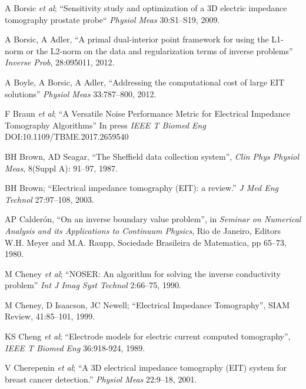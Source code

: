 \documentclass[10pt,journal]{IEEEtran}\def\TBLWIDA{15mm}\def\TBLWIDB{60mm}
\newcommand{\ifmaxthree}[2]{#2 {\em et al}; }
\begin{document}
\begin{thebibliography}{00}
\ifmaxthree{
A Borsic, R Halter R, Y Wan, A Hartov, KD Paulsen,
}{
A Borsic
}
``Sensitivity study and optimization of a 3D electric impedance tomography prostate probe``
{\em Physiol Meas} 30:S1--S19, 2009.

A Borsic, A Adler,
``A primal dual-interior point framework for using the L1-norm or the L2-norm on the data and regularization terms of inverse problems''
{\em Inverse Prob}, 28:095011, 2012.

A Boyle, A Borsic, A Adler,
``Addressing the computational cost of large EIT solutions''
{\em Physiol Meas} 33:787--800, 2012.

\ifmaxthree{
F Braun, M Proença, J Solà, J-P Thiran, A Adler
}{
F Braun
}
``A Versatile Noise Performance Metric for
Electrical Impedance Tomography Algorithms''
In press {\em IEEE T Biomed Eng} DOI:10.1109/TBME.2017.2659540

BH Brown, AD Seagar,
``The Sheffield data collection system'',
{\em Clin Phys Physiol Meas}, 8(Suppl A): 91--97, 1987.

BH Brown;
``Electrical impedance tomography (EIT): a review.''
{\em  J Med Eng Technol} 27:97--108, 2003.

AP Calderón,
``On an inverse boundary value problem'', in
{\em Seminar on Numerical Analysis and its Applications to Continuum Physics}, Rio de Janeiro, Editors W.H. Meyer and M.A. Raupp, Sociedade Brasileira de Matematica, pp 65--73, 1980.

\ifmaxthree{
M Cheney, D Isaacson, JC Newell, S Simske, J Goble.
}{
M Cheney
}
``NOSER: An algorithm for solving the inverse conductivity problem''
{\em Int J Imag Syst Technol} 2:66--75, 1990.

M Cheney, D Isaacson, JC Newell;
``Electrical Impedance Tomography'',
SIAM Review, 41:85--101, 1999.

\ifmaxthree{
KS Cheng, D Isaacson, JC Newell, DG Gisser DG,
}{
KS Cheng
}
``Electrode models for electric current computed tomography'',
{\em IEEE T Biomed Eng} 36:918-924, 1989.

\ifmaxthree{
V Cherepenin, A Karpov, A Korjenevsky, V Kornienko, A Mazaletskaya, D Mazourov, D Meister
}{
V Cherepenin
}
``A 3D electrical impedance tomography (EIT) system for breast cancer detection.''
{\em Physiol Meas} 22:9--18, 2001. %


\end{thebibliography}
\end{document}
